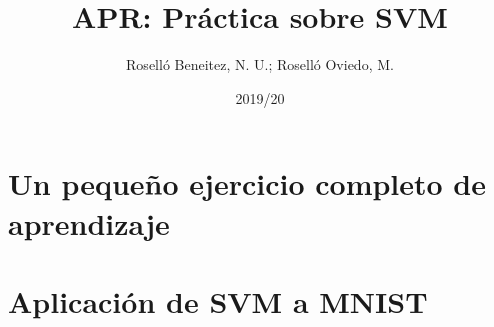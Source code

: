 \documentclass[a4paper]{article}
\begin{document}
\author{Roselló Beneitez, N. U.; Roselló Oviedo, M.}
\title{APR: Práctica sobre SVM}
\date{2019/20}
\maketitle{}
\thispagestyle{empty}

\newpage
\section{Un pequeño ejercicio completo de aprendizaje}

\newpage
\section{Aplicación de SVM a MNIST}
\end{document}
